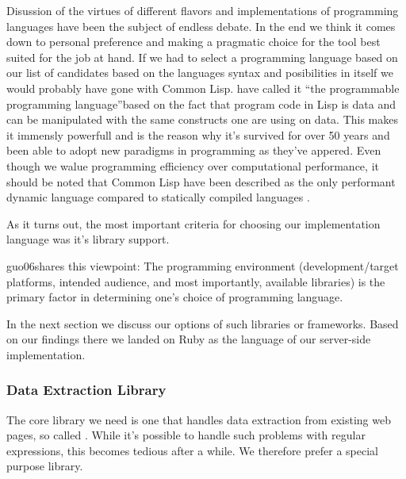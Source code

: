 Disussion of the virtues of different flavors and implementations of
programming languages have been the subject of endless debate.
In the end we think it comes down to
personal preference and making a pragmatic choice for the tool best suited for
the job at hand. If we had to select a programming language based on our list
of candidates based on the languages syntax and posibilities in itself we
would probably have gone with Common Lisp. \citet[p.~27]{foderaro91} have
called it ``the programmable programming language''based on the fact that
program code in Lisp is data and can be manipulated with the same constructs
one are using on data. This makes it immensly powerfull and is the reason why
it's survived for over 50 years \citep[p.~217]{mccarthy78}
and been able to adopt new paradigms in programming as they've appered.
Even though we walue programming efficiency over computational performance,
it should be noted that Common Lisp have been described as the only performant
dynamic language \citep{martin08} compared to statically compiled languages%
.

As it turns out, the most important criteria for choosing our implementation
language was it's library support.

\begin{fullquote}{guo06}{shares this viewpoint:}
  The programming environment (development/target platforms, intended
  audience, and most importantly, available libraries) is the primary factor
  in determining one's choice of programming language.
\end{fullquote}

In the next section we discuss our options
of such libraries or frameworks. Based on our findings there we landed on
Ruby as the language of our server-side implementation.

\subsubsection{Data Extraction Library}

The core library we need is one that handles data extraction from existing
web pages, so called  . While it's possible to
handle such problems with regular expressions, this becomes tedious after a
while. We therefore prefer a special purpose library.

